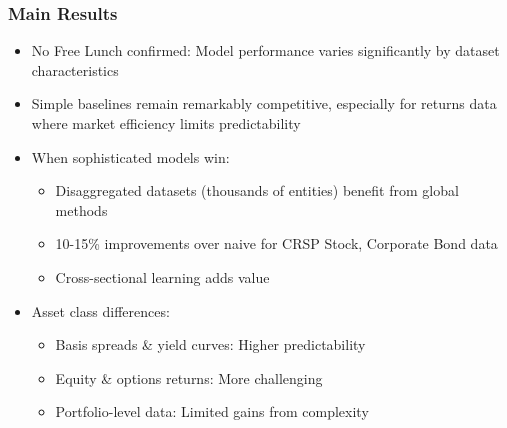 \documentclass[ignorenonframetext, 9pt]{beamer}
\begin{document}
\begin{frame}
  \frametitle{Main Results}
  \begin{itemize}
  \item \alert{No Free Lunch confirmed:} Model performance varies significantly by dataset characteristics
  \vspace{0.3cm}
  \item \alert{Simple baselines remain remarkably competitive}, especially for returns data where market efficiency limits predictability
  \vspace{0.3cm}
  \item \alert{When sophisticated models win:}
  \begin{itemize}
    \item Disaggregated datasets (thousands of entities) benefit from global methods
    \item 10-15\% improvements over naive for CRSP Stock, Corporate Bond data
    \item Cross-sectional learning adds value
  \end{itemize}
  \vspace{0.3cm}
  \item \alert{Asset class differences:}
  \begin{itemize}
    \item Basis spreads \& yield curves: Higher predictability
    \item Equity \& options returns: More challenging
    \item Portfolio-level data: Limited gains from complexity
  \end{itemize}
  \end{itemize}
\end{frame}
\end{document}
